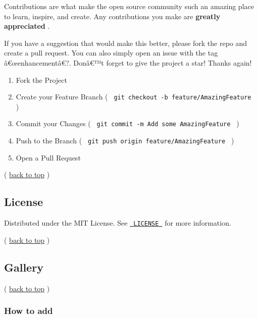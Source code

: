 Contributions are what make the open source community such an amazing
place to learn, inspire, and create. Any contributions you make are
\textbf{greatly appreciated} .

If you have a suggestion that would make this better, please fork the
repo and create a pull request. You can also simply open an issue with
the tag â€œenhancementâ€?. Donâ€™t forget to give the project a star!
Thanks again!

\begin{enumerate}
\tightlist
\item
  Fork the Project
\item
  Create your Feature Branch (
  \texttt{\ git\ checkout\ -b\ feature/AmazingFeature\ } )
\item
  Commit your Changes (
  \texttt{\ git\ commit\ -m\ \textquotesingle{}Add\ some\ AmazingFeature\textquotesingle{}\ }
  )
\item
  Push to the Branch (
  \texttt{\ git\ push\ origin\ feature/AmazingFeature\ } )
\item
  Open a Pull Request
\end{enumerate}

(
\href{https://github.com/typst/packages/raw/main/packages/preview/ionio-illustrate/0.2.0/\#readme-top}{back
to top} )

\subsection{License}\label{license}

Distributed under the MIT License. See
\href{https://github.com/jamesxx/ionio-illustrate/blob/master/LICENSE}{\texttt{\ LICENSE\ }}
for more information.

(
\href{https://github.com/typst/packages/raw/main/packages/preview/ionio-illustrate/0.2.0/\#readme-top}{back
to top} )

\subsection{Gallery}\label{gallery}


(
\href{https://github.com/typst/packages/raw/main/packages/preview/ionio-illustrate/0.2.0/\#readme-top}{back
to top} )

\subsubsection{How to add}\label{how-to-add}

